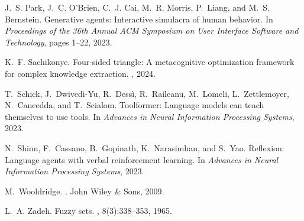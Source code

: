 \documentclass[12pt,a4paper]{article}
\begin{document}
\begin{thebibliography}{99}
J.~S. Park, J.~C. O'Brien, C.~J. Cai, M.~R. Morris, P.~Liang, and M.~S. Bernstein.
\newblock Generative agents: Interactive simulacra of human behavior.
\newblock In {\em Proceedings of the 36th Annual ACM Symposium on User Interface Software and Technology}, pages 1--22, 2023.

K.~F. Sachikonye.
\newblock Four-sided triangle: A metacognitive optimization framework for complex knowledge extraction.
, 2024.

T.~Schick, J.~Dwivedi-Yu, R.~Dessì, R.~Raileanu, M.~Lomeli, L.~Zettlemoyer, N.~Cancedda, and T.~Scialom.
\newblock Toolformer: Language models can teach themselves to use tools.
\newblock In {\em Advances in Neural Information Processing Systems}, 2023.

N.~Shinn, F.~Cassano, B.~Gopinath, K.~Narasimhan, and S.~Yao.
\newblock Reflexion: Language agents with verbal reinforcement learning.
\newblock In {\em Advances in Neural Information Processing Systems}, 2023.

M.~Wooldridge.
.
\newblock John Wiley \& Sons, 2009.

L.~A. Zadeh.
\newblock Fuzzy sets.
, 8(3):338--353, 1965.

\end{thebibliography}
\end{document}
